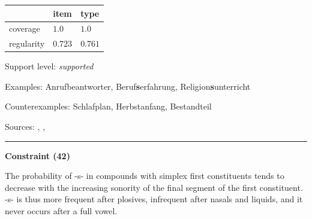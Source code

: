 \vspace{-0.25em}

\begin{table}[!ht]
\begin{center}
\setlength{\extrarowheight}{1pt}
\begin{tabularx}{\columnwidth}{|X|X|X|}
\hline
 & item & type \\
\hline
 coverage & $1.0$ & $1.0$ \\
\hline
 regularity & $0.723$ & $0.761$ \\
\hline
\end{tabularx}
\end{center}
\end{table}

\vspace{-1.35em}

\noindent
Support level: \textit{supported}

\vspace{0.3em}

\noindent
Examples: Anruf{\zeroLinker}beantworter, Beruf\textbf{s}erfahrung, Religion\textbf{s}unterricht

\noindent
Counterexamples: Schlaf{\zeroLinker}plan, Herbst{\zeroLinker}anfang, Bestand{\zeroLinker}teil

\vspace{0.3em}

\noindent
Sources: \citet[572]{fuhrhop_kuerschner_2015}, \citet[10, 21, 22]{nuebling_szczepaniak_2008}, \citet[78]{nuebling_szczepaniak_2013}

\vspace{0.35em}
\hrule




\vspace{0.4em}

\begin{center}
\textbf{Constraint (42)}
\end{center}

\noindent
The probability of -s- in compounds with simplex first constituents tends to decrease with the increasing sonority of the final segment of the first constituent. -s- is thus more frequent after plosives, infrequent after nasals and liquids, and it never occurs after a full vowel.
\vspace{0.5em}



